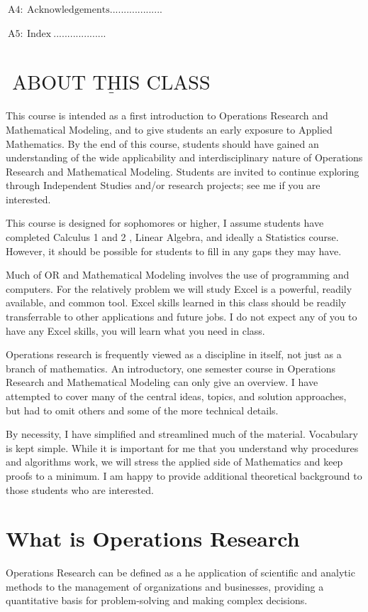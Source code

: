 \documentclass[10pt]{article}
\begin{document}
$\mathrm{~ A 4 : ~ A c k n o w l e d g e m e n t s . . . . . . . . . . . . . . . . . . .}$

$\mathrm{~ A 5 : ~ I n d e x ~ . . . . . . . . . . . . . . . . . . .}$

\section{$\underline{\text { ABOUT THIS CLASS }}$}
This course is intended as a first introduction to Operations Research and Mathematical Modeling, and to give students an early exposure to Applied Mathematics. By the end of this course, students should have gained an understanding of the wide applicability and interdisciplinary nature of Operations Research and Mathematical Modeling. Students are invited to continue exploring through Independent Studies and/or research projects; see me if you are interested.

This course is designed for sophomores or higher, I assume students have completed Calculus 1 and 2 , Linear Algebra, and ideally a Statistics course. However, it should be possible for students to fill in any gaps they may have.

Much of OR and Mathematical Modeling involves the use of programming and computers. For the relatively problem we will study Excel is a powerful, readily available, and common tool. Excel skills learned in this class should be readily transferrable to other applications and future jobs. I do not expect any of you to have any Excel skills, you will learn what you need in class.

Operations research is frequently viewed as a discipline in itself, not just as a branch of mathematics. An introductory, one semester course in Operations Research and Mathematical Modeling can only give an overview. I have attempted to cover many of the central ideas, topics, and solution approaches, but had to omit others and some of the more technical details.

By necessity, I have simplified and streamlined much of the material. Vocabulary is kept simple. While it is important for me that you understand why procedures and algorithms work, we will stress the applied side of Mathematics and keep proofs to a minimum. I am happy to provide additional theoretical background to those students who are interested.

\section{What is Operations Research}
Operations Research can be defined as a he application of scientific and analytic methods to the management of organizations and businesses, providing a quantitative basis for problem-solving and making complex decisions.
\end{document}
